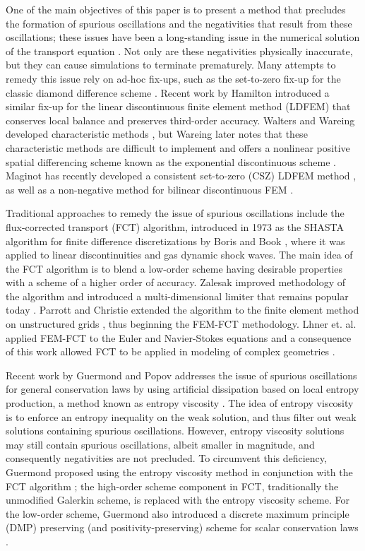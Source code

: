 One of the main objectives of this paper is to present a method that precludes
the formation of spurious oscillations and the negativities that result from
these oscillations; these issues have been a long-standing issue in the
numerical solution of the transport equation \cite{lanthrop}.
Not only are these negativities physically inaccurate, but they can cause
simulations to terminate prematurely. Many attempts to remedy this
issue rely on ad-hoc fix-ups, such as the set-to-zero fix-up for the
classic diamond difference scheme \cite{lewis}. Recent work by Hamilton
introduced a similar fix-up for the linear discontinuous finite element
method (LDFEM) that conserves local balance and preserves third-order accuracy.
Walters and Wareing developed characteristic methods \cite{walters_NC}, but
Wareing later notes that these characteristic methods are difficult to
implement and offers a nonlinear positive spatial differencing scheme
known as the exponential discontinuous scheme \cite{wareing}.
Maginot has recently developed a consistent set-to-zero (CSZ) LDFEM
method \cite{maginot}, as well as a non-negative method for bilinear
discontinuous FEM \cite{maginot_mc2015}.

Traditional approaches to remedy the issue of spurious oscillations include
the flux-corrected transport (FCT) algorithm, introduced in 1973 as
the SHASTA algorithm for finite difference discretizations
by Boris and Book \cite{borisbook}, where it was applied to linear discontinuities
and gas dynamic shock waves. The main idea of the FCT algorithm is to blend a
low-order scheme having desirable properties with a scheme of a higher order of accuracy.
Zalesak improved methodology of the algorithm and introduced a multi-dimensional
limiter that remains popular today \cite{zalesak}.
Parrott and Christie extended the algorithm to the finite element method
on unstructured grids \cite{parrott}, thus beginning the FEM-FCT methodology.
Lhner et. al. applied FEM-FCT to the Euler and Navier-Stokes equations and
a consequence of this work allowed FCT to be applied in modeling of complex
geometries \cite{lohner}.

Recent work by Guermond and Popov addresses the issue of spurious oscillations
for general conservation laws by using artificial dissipation based on
local entropy production, a method known as entropy viscosity \cite{guermond_ev}.
The idea of entropy viscosity is to enforce an entropy inequality on the weak solution,
and thus filter out weak solutions containing spurious oscillations. However,
entropy viscosity solutions may still contain spurious
oscillations, albeit smaller in magnitude, and consequently negativities
are not precluded. To circumvent this deficiency, Guermond proposed using
the entropy viscosity method in conjunction with the FCT
algorithm \cite{guermond_secondorder}; the high-order scheme component in FCT,
traditionally the unmodified Galerkin scheme, is replaced with the entropy
viscosity scheme.
For the low-order
scheme, Guermond also introduced
a discrete maximum principle (DMP) preserving (and positivity-preserving)
scheme for scalar
conservation laws \cite{guermond_firstorder}.

